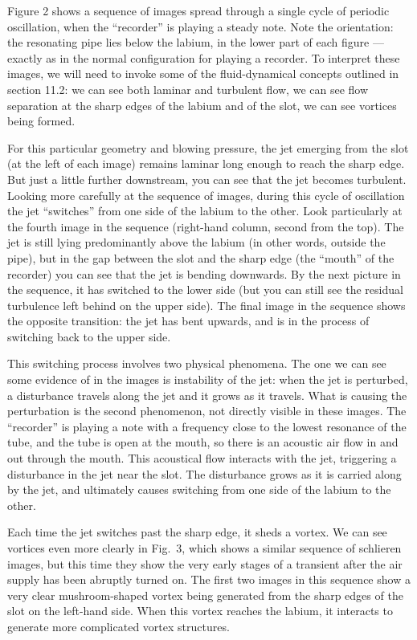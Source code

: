  Figure 2 shows a sequence of images spread through a single cycle of periodic 
  oscillation, when the “recorder” is playing a steady note. Note the 
  orientation: the resonating pipe lies below the labium, in the lower part of 
  each figure --- exactly as in the normal configuration for playing a 
  recorder. To interpret these images, we will need to invoke some of the 
  fluid-dynamical concepts outlined in section 11.2: we can see both laminar 
  and turbulent flow, we can see flow separation at the sharp edges of the 
  labium and of the slot, we can see vortices being formed. 

  For this particular geometry and blowing pressure, the jet emerging from the 
  slot (at the left of each image) remains laminar long enough to reach the 
  sharp edge. But just a little further downstream, you can see that the jet 
  becomes turbulent. Looking more carefully at the sequence of images, during 
  this cycle of oscillation the jet “switches” from one side of the labium to 
  the other. Look particularly at the fourth image in the sequence (right-hand 
  column, second from the top). The jet is still lying predominantly above the 
  labium (in other words, outside the pipe), but in the gap between the slot 
  and the sharp edge (the “mouth” of the recorder) you can see that the jet is 
  bending downwards. By the next picture in the sequence, it has switched to 
  the lower side (but you can still see the residual turbulence left behind on 
  the upper side). The final image in the sequence shows the opposite 
  transition: the jet has bent upwards, and is in the process of switching back 
  to the upper side. 

  This switching process involves two physical phenomena. The one we can see 
  some evidence of in the images is instability of the jet: when the jet is 
  perturbed, a disturbance travels along the jet and it grows as it travels. 
  What is causing the perturbation is the second phenomenon, not directly 
  visible in these images. The “recorder” is playing a note with a frequency 
  close to the lowest resonance of the tube, and the tube is open at the mouth, 
  so there is an acoustic air flow in and out through the mouth. This 
  acoustical flow interacts with the jet, triggering a disturbance in the jet 
  near the slot. The disturbance grows as it is carried along by the jet, and 
  ultimately causes switching from one side of the labium to the other. 

  Each time the jet switches past the sharp edge, it sheds a vortex. We can see 
  vortices even more clearly in Fig.\ 3, which shows a similar sequence of 
  schlieren images, but this time they show the very early stages of a 
  transient after the air supply has been abruptly turned on. The first two 
  images in this sequence show a very clear mushroom-shaped vortex being 
  generated from the sharp edges of the slot on the left-hand side. When this 
  vortex reaches the labium, it interacts to generate more complicated vortex 
  structures. 

